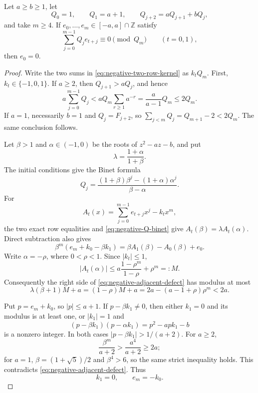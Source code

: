 \begin{lemma}
\label{lem:negative-two-row-rigidity}
Let $a\ge b\ge1$, let
\[
Q_0=1,\qquad Q_1=a+1,\qquad
Q_{j+2}=aQ_{j+1}+bQ_j,
\]
and take $m\ge4$.  If $e_0,\ldots,e_m\in[-a,a]\cap\mathbb Z$ satisfy
\begin{equation}
\sum_{j=0}^{m-1}Q_je_{t+j}\equiv0\pmod {Q_m}
\qquad(t=0,1),
\label{eq:negative-two-row-kernel}
\end{equation}
then $e_0=0$.
\end{lemma}

\begin{proof}
Write the two sums in \eqref{eq:negative-two-row-kernel} as $k_tQ_m$.
First, $k_t\in\{-1,0,1\}$.  If $a\ge2$, then
$Q_{j+1}>aQ_j$, and hence
\[
a\sum_{j=0}^{m-1}Q_j
 <aQ_m\sum_{r\ge1}a^{-r}
 =\frac{a}{a-1}Q_m\le2Q_m.
\]
If $a=1$, necessarily $b=1$ and $Q_j=F_{j+2}$, so
$\sum_{j<m}Q_j=Q_{m+1}-2<2Q_m$.  The same conclusion follows.

Let $\beta>1$ and $\alpha\in(-1,0)$ be the roots of $z^2-az-b$, and put
\[
\lambda=\frac{1+\alpha}{1+\beta}.
\]
The initial conditions give the Binet formula
\begin{equation}
Q_j=\frac{(1+\beta)\beta^j-(1+\alpha)\alpha^j}{\beta-\alpha}.
\label{eq:negative-Q-binet}
\end{equation}
For
\[
A_t(x)=\sum_{j=0}^{m-1}e_{t+j}x^j-k_tx^m,
\]
the two exact row equalities and \eqref{eq:negative-Q-binet} give
$A_t(\beta)=\lambda A_t(\alpha)$.  Direct subtraction also gives
\begin{equation}
\beta^m(e_m+k_0-\beta k_1)
=\beta A_1(\beta)-A_0(\beta)+e_0.
\label{eq:negative-adjacent-defect}
\end{equation}
Write $\alpha=-\rho$, where $0<\rho<1$.  Since $|k_t|\le1$,
\[
|A_t(\alpha)|
\le a\frac{1-\rho^m}{1-\rho}+\rho^m=:M.
\]
Consequently the right side of
\eqref{eq:negative-adjacent-defect} has modulus at most
\[
\lambda(\beta+1)M+a
=(1-\rho)M+a
=2a-(a-1+\rho)\rho^m<2a.
\]

Put $p=e_m+k_0$, so $|p|\le a+1$.  If
$p-\beta k_1\ne0$, then either $k_1=0$ and its modulus is at least one,
or $|k_1|=1$ and
\[
(p-\beta k_1)(p-\alpha k_1)
=p^2-apk_1-b
\]
is a nonzero integer.  In both cases
$|p-\beta k_1|>1/(a+2)$.  For $a\ge2$,
\[
\frac{\beta^m}{a+2}>\frac{a^4}{a+2}\ge2a;
\]
for $a=1$, $\beta=(1+\sqrt5)/2$ and $\beta^4>6$, so the same strict
inequality holds.  This contradicts
\eqref{eq:negative-adjacent-defect}.  Thus
\begin{equation}
k_1=0,
\qquad e_m=-k_0.
\label{eq:negative-carry-collapse}
\end{equation}


\end{proof}
